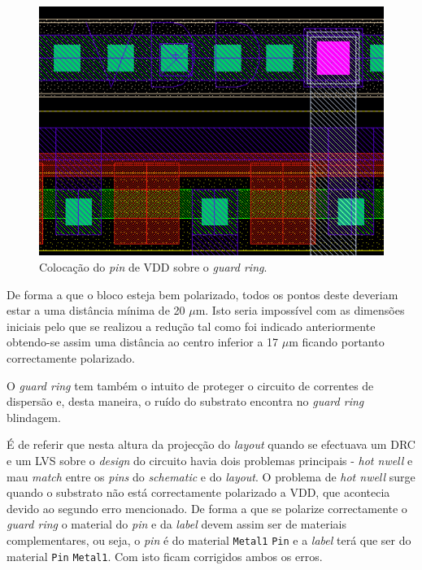 \documentclass[11pt]{article}
\numberwithin{equation}{section}
\begin{document}
\begin{figure}[H]
	\centering
	\includegraphics[keepaspectratio=true, scale=0.22]{exps/layout/pinVDD}
	\vspace{-0.5em}
	\caption{Colocação do \textit{pin} de VDD sobre o \textit{guard ring}.}
	\vspace{-0.8em}
\end{figure}

De forma a que o bloco esteja bem polarizado, todos os pontos deste deveriam estar a uma distância mínima de 20 $\mu$m. Isto seria impossível com as dimensões iniciais pelo que se realizou a redução tal como foi indicado anteriormente obtendo-se assim uma distância ao centro inferior a 17 $\mu$m ficando portanto correctamente polarizado.

O \textit{guard ring} tem também o intuito de proteger o circuito de correntes de dispersão e, desta maneira, o ruído do substrato encontra no \textit{guard ring} blindagem.

É de referir que nesta altura da projecção do \textit{layout} quando se efectuava um DRC e um LVS sobre o \textit{design} do circuito havia dois problemas principais - \textit{hot nwell} e mau \textit{match} entre os \textit{pins} do \textit{schematic} e do \textit{layout}. O problema de \textit{hot nwell} surge quando o substrato não está correctamente polarizado a VDD, que acontecia devido ao segundo erro mencionado. De forma a que se polarize correctamente o \textit{guard ring} o material do \textit{pin} e da \textit{label} devem assim ser de materiais complementares, ou seja, o \textit{pin} é do material \texttt{Metal1} \texttt{Pin} e a \textit{label} terá que ser do material \texttt{Pin} \texttt{Metal1}. Com isto ficam corrigidos ambos os erros.
\end{document}
